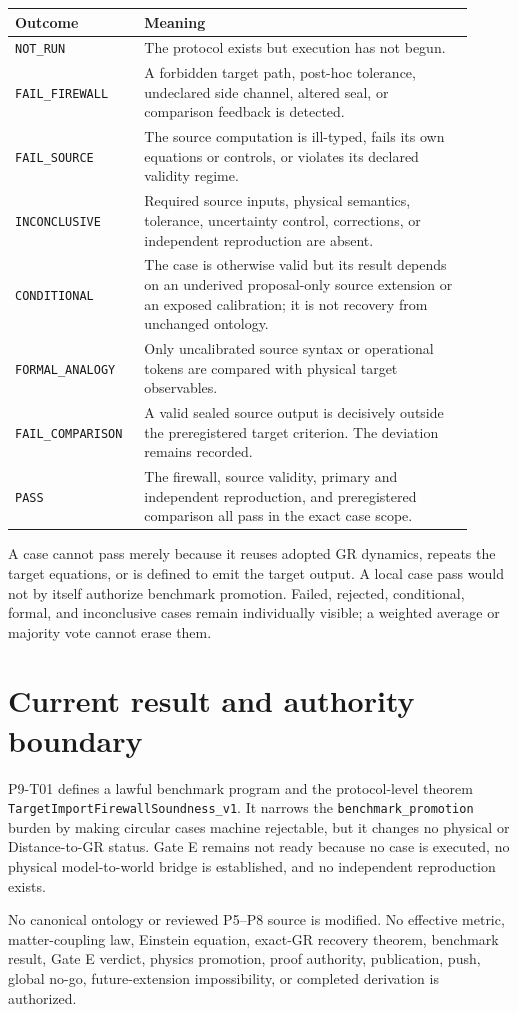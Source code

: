 \documentclass[11pt]{article}
\begin{document}
\begin{longtable}{p{0.24\linewidth}p{0.67\linewidth}}
\toprule
Outcome & Meaning\\
\midrule
\texttt{NOT\_RUN} & The protocol exists but execution has not begun.\\
\texttt{FAIL\_FIREWALL} & A forbidden target path, post-hoc tolerance,
undeclared side channel, altered seal, or comparison feedback is detected.\\
\texttt{FAIL\_SOURCE} & The source computation is ill-typed, fails its own
equations or controls, or violates its declared validity regime.\\
\texttt{INCONCLUSIVE} & Required source inputs, physical semantics, tolerance,
uncertainty control, corrections, or independent reproduction are absent.\\
\texttt{CONDITIONAL} & The case is otherwise valid but its result depends on
an underived proposal-only source extension or an exposed calibration; it is
not recovery from unchanged ontology.\\
\texttt{FORMAL\_ANALOGY} & Only uncalibrated source syntax or operational
tokens are compared with physical target observables.\\
\texttt{FAIL\_COMPARISON} & A valid sealed source output is decisively outside
the preregistered target criterion.  The deviation remains recorded.\\
\texttt{PASS} & The firewall, source validity, primary and independent
reproduction, and preregistered comparison all pass in the exact case scope.\\
\bottomrule
\end{longtable}

A case cannot pass merely because it reuses adopted GR dynamics, repeats the
target equations, or is defined to emit the target output.  A local case pass
would not by itself authorize benchmark promotion.  Failed, rejected,
conditional, formal, and inconclusive cases remain individually visible; a
weighted average or majority vote cannot erase them.

\section{Current result and authority boundary}

P9-T01 defines a lawful benchmark program and the protocol-level theorem
\texttt{TargetImportFirewallSoundness\_v1}.  It narrows the
\texttt{benchmark\_promotion} burden by making circular cases machine
rejectable, but it changes no physical or Distance-to-GR status.  Gate E
remains not ready because no case is executed, no physical model-to-world
bridge is established, and no independent reproduction exists.

No canonical ontology or reviewed P5--P8 source is modified.  No effective
metric, matter-coupling law, Einstein equation, exact-GR recovery theorem,
benchmark result, Gate E verdict, physics promotion, proof authority,
publication, push, global no-go, future-extension impossibility, or completed
derivation is authorized.
\end{document}

